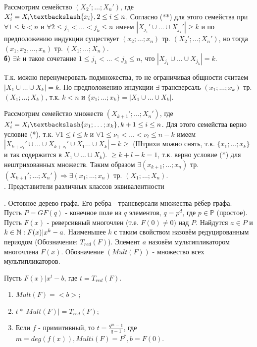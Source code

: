 Рассмотрим семейство $(X_2'; \dots; X_n')$, где $X_i'=X_i \textbackslash \{x_i\}, 2 \leq i \leq n$.
Согласно (**) для этого семейства при $\forall 1 \leq k < n$ и $\forall 2 \leq j_1 < \dots < j_k \leq n$ имеем $|X_{j_1}' \cup \dots \cup X_{j_k}'| \geq k$ и по предположению индукции существует $(x_2; \dots; x_n)$ тр. $(X_2'; \dots; X_n')$, но тогда $(x_1, x_2, \dots, x_n)$ тр. $(X_1; \dots; X_n)$.\\

\textbf{б)} $\exists k$ и такое сочетание $1 \leq j_1 < \dots < j_k \leq n$, что $|X_{j_1} \cup \dots \cup X_{j_k}|=k$.

Т.к. можно перенумеровать подмножества, то не ограничивая общности считаем $|X_1 \cup \dots \cup X_k|=k$. По предположению индукции $\exists$ трансверсаль $(x_1; \dots; x_k)$ тр. $(X_1; \dots; X_k)$, т.к. $k<n$ и $\{x_1;\dots;x_k\}=|X_1 \cup \dots \cup X_k|$.

Рассмотрим семейство множеств $(X_{k+1}'; \dots; X_n')$, где $X_i'=X_i \textbackslash \{x_1;\dots;x_k\}, k+1 \leq i \leq n$. Для этого семейства верно условие (*), т.к. $\forall 1 \leq l \leq k$ и $\forall 1 \leq \nu_1 < \dots < \nu_l \leq n-k$ имеем $|X_{k+{\nu_1}}' \cup \dots \cup X_{k+{\nu_l}}' \cup X_1 \dots \cup X_k|-k\geq$
(Штрихи можно снять, т.к. $\{x_1; \dots; x_k\}$ и так содержится в $X_1 \cup \dots \cup X_k$).
$\geq k+l-k=1$, т.к. верно условие (*) для нештрихованных множеств. Таким образом $\exists  (x_{k+1}; \dots; x_n)$ тр. $(X_{k+1}'; \dots; X_n') \Rightarrow \exists (x_1; \dots; x_n)$ тр. $(X_1; \dots; X_n)$.\\

. Представители различных классов эквивалентности

. Остовное дерево графа. Его ребра - трансверсали множества рёбер графа.\\

\opr Пусть $P=GF(q)$ - конечное поле из $q$ элементов, $q=p^d$, где $p \in \mathbb{P}$ (простое). Пусть $F(x)$ - реверсивный многочлен (т.е. $F(0) \neq 0 )$ над $P$. Найдутся $a \in P$ и $k \in \mathbb{N} : F(x)| x^k - a.$ Наименьшее $k$ с таким свойством назовём редуцированным периодом (Обозначение: $T_{red}(F)$). Элемент $a$ назовём мультипликатором многочлена $F(x)$. Обозначение $(Mult(F))$ - множество всех мультипликаторов.

Пусть $F(x)|x^t - b$, где $t = T_{red}(F)$.

\utv
\begin{enumerate}
\item $Mult(F) = <b>$;
\item $t * |Mult(F)|=T_{red}(F)$;
\item  Если $f$ - примитивный, то $t= \frac{q^m - 1}{q-1}$, где $m=deg(f(x)), Multi(F)=P^*, b=F(0)$.
\end{enumerate}

